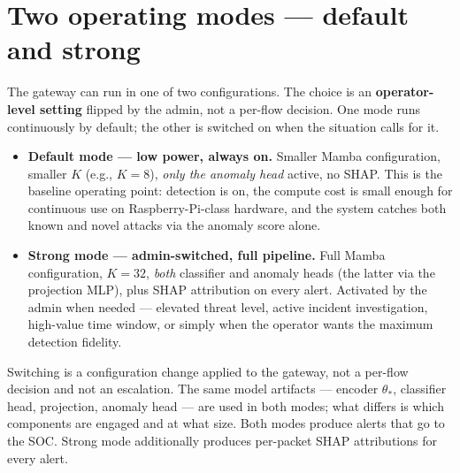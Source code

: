 \documentclass[11pt,a4paper]{article}
\begin{document}
\section{Two operating modes --- default and strong}

The gateway can run in one of two configurations. The choice is an \textbf{operator-level setting} flipped by the admin, not a per-flow decision. One mode runs continuously by default; the other is switched on when the situation calls for it.

\begin{itemize}[leftmargin=*, itemsep=2pt]
  \item \textbf{Default mode --- low power, always on.} Smaller Mamba configuration, smaller $K$ (e.g., $K=8$), \emph{only the anomaly head} active, no SHAP. This is the baseline operating point: detection is on, the compute cost is small enough for continuous use on Raspberry-Pi-class hardware, and the system catches both known and novel attacks via the anomaly score alone.
  \item \textbf{Strong mode --- admin-switched, full pipeline.} Full Mamba configuration, $K=32$, \emph{both} classifier and anomaly heads (the latter via the projection MLP), plus SHAP attribution on every alert. Activated by the admin when needed --- elevated threat level, active incident investigation, high-value time window, or simply when the operator wants the maximum detection fidelity.
\end{itemize}

Switching is a configuration change applied to the gateway, not a per-flow decision and not an escalation. The same model artifacts --- encoder $\theta_*$, classifier head, projection, anomaly head --- are used in both modes; what differs is which components are engaged and at what size. Both modes produce alerts that go to the SOC. Strong mode additionally produces per-packet SHAP attributions for every alert.
\end{document}
